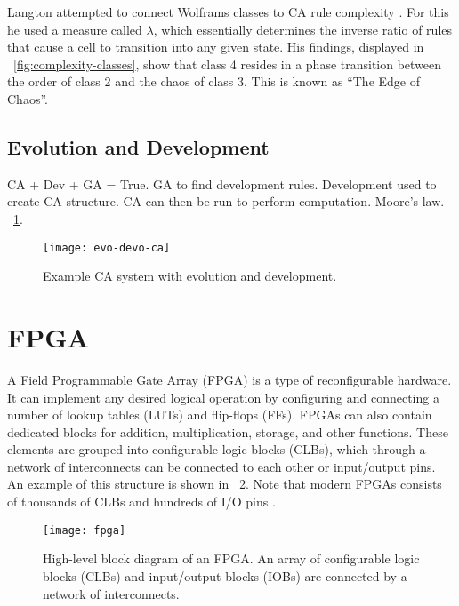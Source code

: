 Langton attempted to connect Wolframs classes to CA rule complexity \cite{langton1990edgeofchaos}.
For this he used a measure called $\lambda$, which essentially determines the inverse ratio of rules that cause a cell to transition into any given state.
His findings, displayed in \figurename~\ref{fig:complexity-classes}, show that class 4 resides in a phase transition between the order of class 2 and the chaos of class 3.
This is known as ``The Edge of Chaos''.

\subsection{Evolution and Development}

\TODO
CA + Dev + GA = True.
GA to find development rules.
Development used to create CA structure.
CA can then be run to perform computation.
Moore's law.
\figurename~\ref{fig:evo-devo-ca}.

\begin{figure}[!ht]
    \centering
    \texttt{[image: evo-devo-ca]}
    \caption[CA system with evolution and development]{
        Example CA system with evolution and development.
    }
    \label{fig:evo-devo-ca}
\end{figure}


\section{FPGA}

A Field Programmable Gate Array (FPGA) is a type of reconfigurable hardware.
It can implement any desired logical operation by configuring and connecting a number of lookup tables (LUTs) and flip-flops (FFs).
FPGAs can also contain dedicated blocks for addition, multiplication, storage, and other functions.
These elements are grouped into configurable logic blocks (CLBs), which through a network of interconnects can be connected to each other or input/output pins.
An example of this structure is shown in \figurename~\ref{fig:fpga}.
Note that modern FPGAs consists of thousands of CLBs and hundreds of I/O pins \cite{ds160}.

\begin{figure}[!ht]
    \centering
    \texttt{[image: fpga]}
    \caption[FPGA]{
        High-level block diagram of an FPGA.
        An array of configurable logic blocks (CLBs) and input/output blocks (IOBs) are connected by a network of interconnects.
    }
    \label{fig:fpga}
\end{figure}

